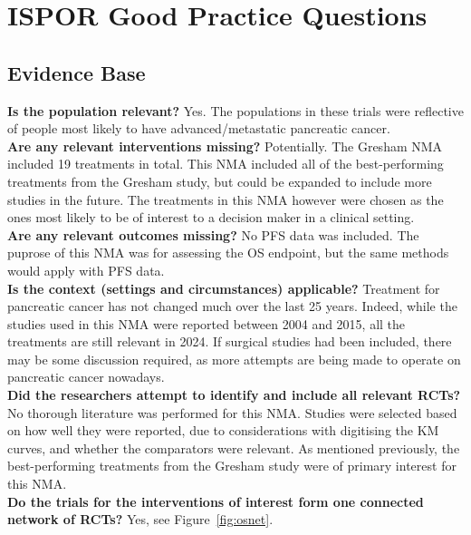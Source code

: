 \chapter{ISPOR Good Practice Questions}\label{isporqs}

\section{Evidence Base}
\textbf{Is the population relevant?} Yes. The populations in these trials were reflective of people most likely to have advanced/metastatic pancreatic cancer. \\ 

\textbf{Are any relevant interventions missing?} Potentially. The Gresham NMA included 19 treatments in total. This NMA included all of the best-performing treatments from the Gresham study, but could be expanded to include more studies in the future. The treatments in this NMA however were chosen as the ones most likely to be of interest to a decision maker in a clinical setting. \\ 

\textbf{Are any relevant outcomes missing?} No PFS data was included. The puprose of this NMA was for assessing the OS endpoint, but the same methods would apply with PFS data. \\

\textbf{Is the context (settings and circumstances) applicable?} Treatment for pancreatic cancer has not changed much over the last 25 years. Indeed, while the studies used in this NMA were reported between 2004 and 2015, all the treatments are still relevant in 2024. If surgical studies had been included, there may be some discussion required, as more attempts are being made to operate on pancreatic cancer nowadays. \\

\textbf{Did the researchers attempt to identify and include all
relevant RCTs?} No thorough literature was performed for this NMA. Studies were selected based on how well they were reported, due to considerations with digitising the KM curves, and whether the comparators were relevant. As mentioned previously, the best-performing treatments from the Gresham study were of primary interest for this NMA.\\

\textbf{Do the trials for the interventions of interest form one
connected network of RCTs?} Yes, see Figure~\ref{fig:osnet}.\\

